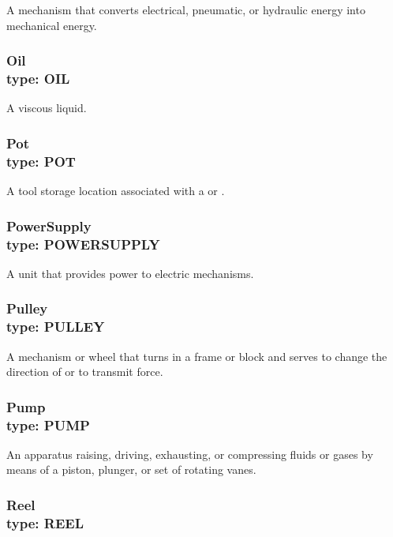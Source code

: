 A mechanism that converts electrical, pneumatic, or hydraulic energy into mechanical energy.


\subsubsection[Oil]{Oil \\ {\small type: OIL}}
\label{sec:Oil}



A viscous liquid.


\subsubsection[Pot]{Pot \\ {\small type: POT}}
\label{sec:Pot}



A tool storage location associated with a  or .


\subsubsection[PowerSupply]{PowerSupply \\ {\small type: POWER\textunderscore SUPPLY}}
\label{sec:PowerSupply}



A unit that provides power to electric mechanisms.


\subsubsection[Pulley]{Pulley \\ {\small type: PULLEY}}
\label{sec:Pulley}



A mechanism or wheel that turns in a frame or block and serves to change the direction of or to transmit force.


\subsubsection[Pump]{Pump \\ {\small type: PUMP}}
\label{sec:Pump}



An apparatus raising, driving, exhausting, or compressing fluids or gases by means of a piston, plunger, or set of rotating vanes.


\subsubsection[Reel]{Reel \\ {\small type: REEL}}
\label{sec:Reel}



